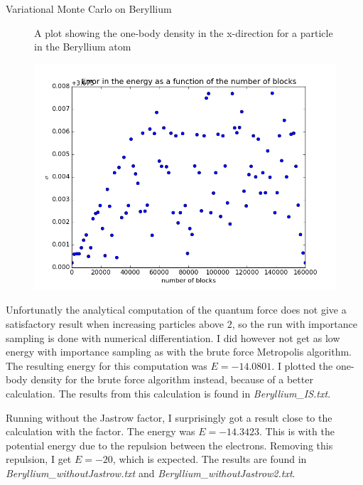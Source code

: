 \documentclass[a4paper, 12pt, titlepage]{article}
\begin{document}
\begin{section}{Variational Monte Carlo on Beryllium}
\begin{figure}
 	\caption{A plot showing the one-body density in the x-direction for a particle in the Beryllium atom}
 \end{figure}
 \begin{figure}
 	\centering
 	\includegraphics[width=\textwidth]{../python_programs/BerylliumBlocking.png}
 \end{figure}


 Unfortunatly the analytical computation of the quantum force does not give a satisfactory result when increasing particles above $2$, so the run with importance sampling is done with numerical differentiation. I did however not get as low energy with importance sampling as with the brute force Metropolis algorithm. The resulting energy for this computation was $E = -14.0801$. I plotted the one-body density for the brute force algorithm instead, because of a better calculation. The results from this calculation is found in \textit{Beryllium\_IS.txt}. 

 Running without the Jastrow factor, I surprisingly got a result close to the calculation with the factor. The energy was $E = -14.3423$. This is with the potential energy due to the repulsion between the electrons. Removing this repulsion, I get $E = -20$, which is expected. The results are found in \textit{Beryllium\_withoutJastrow.txt} and \textit{Beryllium\_withoutJastrow2.txt}. 
 

\end{section}
\end{document}
